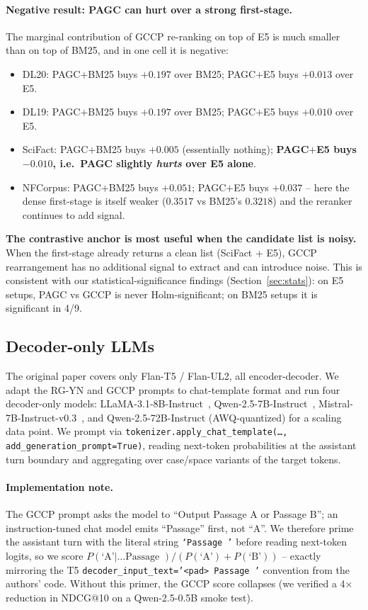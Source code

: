 \documentclass[sigconf]{acmart}
\begin{document}
\paragraph{Negative result: PAGC can hurt over a strong first-stage.}
The marginal contribution of GCCP re-ranking on top of E5 is much
smaller than on top of BM25, and in one cell it is negative:
\begin{itemize}[leftmargin=1.5em,nosep]
    \item DL20: PAGC$+$BM25 buys $+0.197$ over BM25; PAGC$+$E5 buys
          $+0.013$ over E5.
    \item DL19: PAGC$+$BM25 buys $+0.197$ over BM25; PAGC$+$E5 buys
          $+0.010$ over E5.
    \item SciFact: PAGC$+$BM25 buys $+0.005$ (essentially nothing);
          \textbf{PAGC$+$E5 buys $-0.010$, i.e.\ PAGC slightly
          \emph{hurts} over E5 alone}.
    \item NFCorpus: PAGC$+$BM25 buys $+0.051$; PAGC$+$E5 buys
          $+0.037$ -- here the dense first-stage is itself weaker
          ($0.3517$ vs BM25's $0.3218$) and the reranker continues
          to add signal.
\end{itemize}
\textbf{The contrastive anchor is most useful when the candidate
list is noisy.} When the first-stage already returns a clean list
(SciFact + E5), GCCP rearrangement has no additional signal to
extract and can introduce noise. This is consistent with our
statistical-significance findings (Section~\ref{sec:stats}): on E5
setups, PAGC vs GCCP is never Holm-significant; on BM25 setups it
is significant in 4/9.

\subsection{Decoder-only LLMs}
\label{sec:decoder}
The original paper covers only Flan-T5 / Flan-UL2, all encoder-decoder.
We adapt the RG-YN and GCCP prompts to chat-template format and run
four decoder-only models: LLaMA-3.1-8B-Instruct~\cite{llama3report},
Qwen-2.5-7B-Instruct~\cite{qwen25technical},
Mistral-7B-Instruct-v0.3~\cite{jiang2023mistral}, and
Qwen-2.5-72B-Instruct (AWQ-quantized) for a scaling data point. We
prompt via
\texttt{tokenizer.apply\_chat\_template(\dots, add\_generation\_prompt=True)},
reading next-token probabilities at the assistant turn boundary and
aggregating over case/space variants of the target tokens.

\paragraph{Implementation note.} The GCCP prompt asks the model to
``Output Passage A or Passage B''; an instruction-tuned chat model
emits ``Passage'' first, not ``A''. We therefore prime the assistant
turn with the literal string \texttt{`Passage '} before reading next-token
logits, so we score $P(\text{`A'} | \dots\text{Passage }) /
(P(\text{`A'}) + P(\text{`B'}))$ -- exactly mirroring the T5
\texttt{decoder\_input\_text='<pad> Passage '} convention from the
authors' code. Without this primer, the GCCP score collapses (we
verified a 4× reduction in NDCG@10 on a Qwen-2.5-0.5B smoke test).
\end{document}
